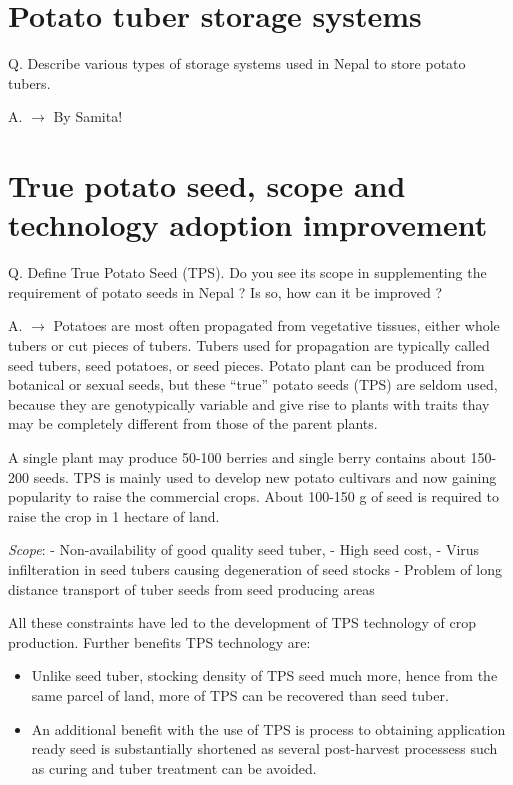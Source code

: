 \documentclass[
  openany]{book}
\providecommand{\tightlist}{%
  \setlength{\itemsep}{0pt}\setlength{\parskip}{0pt}}
\begin{document}
\hypertarget{potato-tuber-storage-systems}{%
\section{Potato tuber storage systems}\label{potato-tuber-storage-systems}}

Q. Describe various types of storage systems used in Nepal to store potato tubers.

A. \(\longrightarrow\) By Samita!

\hypertarget{true-potato-seed-scope-and-technology-adoption-improvement}{%
\section{True potato seed, scope and technology adoption improvement}\label{true-potato-seed-scope-and-technology-adoption-improvement}}

Q. Define True Potato Seed (TPS). Do you see its scope in supplementing the requirement of potato seeds in Nepal ? Is so, how can it be improved ?

A. \(\longrightarrow\) Potatoes are most often propagated from vegetative tissues, either whole tubers or cut pieces of tubers. Tubers used for propagation are typically called seed tubers, seed potatoes, or seed pieces. Potato plant can be produced from botanical or sexual seeds, but these ``true'' potato seeds (TPS) are seldom used, because they are genotypically variable and give rise to plants with traits thay may be completely different from those of the parent plants.

A single plant may produce 50-100 berries and single berry contains about 150-200 seeds. TPS is mainly used to develop new potato cultivars and now gaining popularity to raise the commercial crops. About 100-150 g of seed is required to raise the crop in 1 hectare of land.

\emph{Scope}:
- Non-availability of good quality seed tuber,
- High seed cost,
- Virus infilteration in seed tubers causing degeneration of seed stocks
- Problem of long distance transport of tuber seeds from seed producing areas

All these constraints have led to the development of TPS technology of crop production. Further benefits TPS technology are:

\begin{itemize}
\tightlist
\item
  Unlike seed tuber, stocking density of TPS seed much more, hence from the same parcel of land, more of TPS can be recovered than seed tuber.
\item
  An additional benefit with the use of TPS is process to obtaining application ready seed is substantially shortened as several post-harvest processess such as curing and tuber treatment can be avoided.
\end{itemize}
\end{document}
